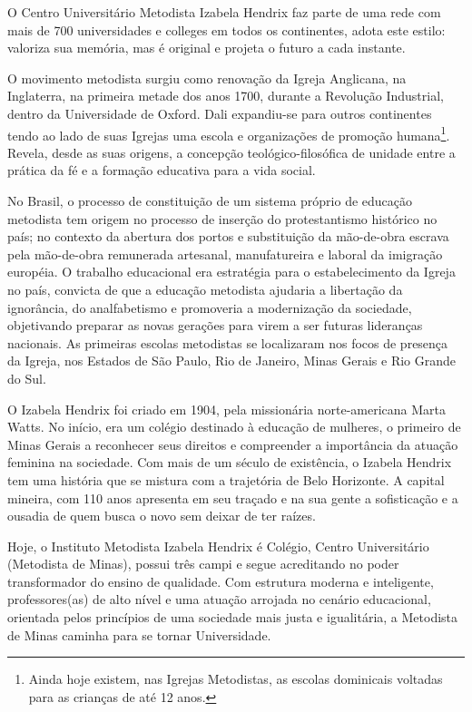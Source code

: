 \documentclass[a4paper, 12pt, openright, oneside, german, french, english, brazil]{abntex2}
\begin{document}
O Centro Universitário Metodista Izabela Hendrix faz parte de uma rede com mais de 700 universidades e colleges em todos os continentes, adota este estilo: valoriza sua memória, mas é original e projeta o futuro a cada instante.

O movimento metodista surgiu como renovação da Igreja Anglicana, na Inglaterra, na primeira metade dos anos 1700, durante a Revolução Industrial, dentro da Universidade de Oxford. Dali expandiu-se para outros continentes tendo ao lado de suas Igrejas uma escola e organizações de promoção humana\footnote{Ainda hoje existem, nas Igrejas Metodistas, as escolas dominicais voltadas para as crianças de até 12 anos.}. Revela, desde as suas origens, a concepção teológico-filosófica de unidade entre a prática da fé e a formação educativa para a vida social.

No Brasil, o processo de constituição de um sistema próprio de educação metodista tem origem no processo de inserção do protestantismo histórico no país; no contexto da abertura dos portos e substituição da mão-de-obra escrava pela mão-de-obra remunerada artesanal, manufatureira e laboral da imigração européia. O trabalho educacional era estratégia para o estabelecimento da Igreja no país, convicta de que a educação metodista ajudaria a libertação da ignorância, do analfabetismo e promoveria a modernização da sociedade, objetivando preparar as novas gerações para virem a ser futuras lideranças nacionais. As primeiras escolas metodistas se localizaram nos focos de presença da Igreja, nos Estados de São Paulo, Rio de Janeiro, Minas Gerais e Rio Grande do Sul.

O Izabela Hendrix foi criado em 1904, pela missionária norte-americana Marta Watts. No início, era um colégio destinado à educação de mulheres, o primeiro de Minas Gerais a reconhecer seus direitos e compreender a importância da atuação feminina na sociedade. Com mais de um século de existência, o Izabela Hendrix tem uma história que se mistura com a trajetória de Belo Horizonte. A capital mineira, com 110 anos apresenta em seu traçado e na sua gente a sofisticação e a ousadia de quem busca o novo sem deixar de ter raízes.

Hoje, o Instituto Metodista Izabela Hendrix é Colégio, Centro Universitário (Metodista de Minas), possui três campi e segue acreditando no poder transformador do ensino de qualidade. Com estrutura moderna e inteligente, professores(as) de alto nível e uma atuação arrojada no cenário educacional, orientada pelos princípios de uma sociedade mais justa e igualitária, a Metodista de Minas caminha para se tornar Universidade.
\end{document}
